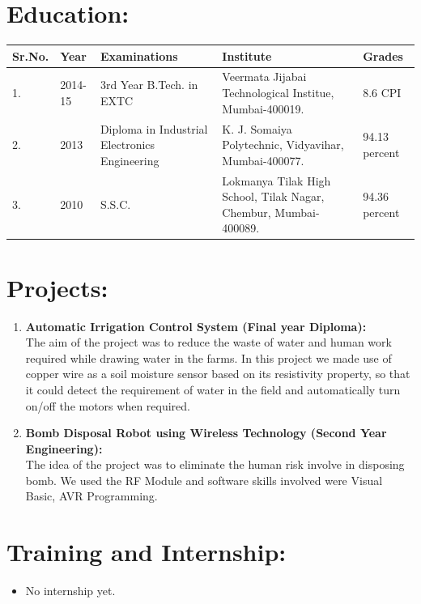 \documentclass[a4 paper,12pt]{article}
\begin{document}
\begin{minipage}{0.98\textwidth}
\section{Education:}
\vspace{-0.1in}
\begin{center}
	\begin{tabular}{|p{1.5cm}|p{2cm}|p{5cm}|p{4.5cm}|p{2.5cm}|}
		\hline
		\textbf{Sr.No.} & \textbf{Year} & \textbf{Examinations} & \textbf{Institute} & \textbf{Grades}\\ [0.5ex] 
		\hline
		1. & 2014-15 &3rd Year B.Tech. in EXTC & Veermata Jijabai Technological Institue, Mumbai-400019. & 8.6 CPI \\ 
		\hline
		2. & 2013 & Diploma in Industrial Electronics Engineering & K. J. Somaiya Polytechnic, Vidyavihar, Mumbai-400077.& 94.13 percent \\
		\hline
		3. & 2010 & S.S.C. & Lokmanya Tilak High School, Tilak Nagar, Chembur, Mumbai-400089. & 94.36 percent \\
		\hline
	\end{tabular}
\end{center}

\section{Projects:}
\begin{enumerate}
	\vspace{-0.1in}
	\item\textbf{Automatic Irrigation Control System (Final year Diploma):}\\
	The aim of the project was to reduce the waste of water and human work required while drawing water in the farms. In this project we made use of copper wire as a soil moisture sensor based on its resistivity property, so that it could detect the requirement of water in the field and automatically turn on/off the motors when required.
	\item\textbf{Bomb Disposal Robot using Wireless Technology (Second Year Engineering):}\\
	The idea of the project was to eliminate the human risk involve in disposing bomb. We used the RF Module and software skills involved were Visual Basic, AVR Programming.
\end{enumerate}

\section{Training and Internship:}
\begin{itemize}
	\vspace{-0.1in}
	\item No internship yet.\\\\
\end{itemize}
\end{minipage}
\end{document}
